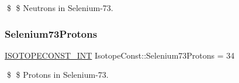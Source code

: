 \$ \$ Neutrons in Selenium-\/73. \mbox{\label{group___isotope_const-_selenium-_se73_gac38162c4a63394fbb18dab6606929e79}} 
\subsubsection{\texorpdfstring{Selenium73\+Protons}{Selenium73Protons}}
{\footnotesize\ttfamily \mbox{\hyperlink{group___isotope_const-_macros_ga5f18360b3e99483a35c32d789e62621c}{I\+S\+O\+T\+O\+P\+E\+C\+O\+N\+S\+T\+\_\+\+I\+NT}} Isotope\+Const\+::\+Selenium73\+Protons = 34}

\$ \$ Protons in Selenium-\/73. 